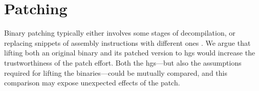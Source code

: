 \section{Patching}
Binary patching typically either involves some stages of decompilation, or replacing snippets of assembly instructions with different ones \autocite{duck2020binary}.
We argue that lifting both an original binary and its patched version to \acp{hg} would increase the trustworthiness of the patch effort.
Both the \acp{hg}---but also the assumptions required for lifting the binaries---could be mutually compared, and this comparison may expose unexpected effects of the patch.
